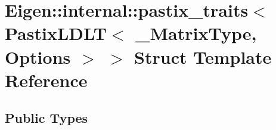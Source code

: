 \hypertarget{struct_eigen_1_1internal_1_1pastix__traits_3_01_pastix_l_d_l_t_3_01___matrix_type_00_01_options_01_4_01_4}{}\section{Eigen\+:\+:internal\+:\+:pastix\+\_\+traits$<$ Pastix\+L\+D\+LT$<$ \+\_\+\+Matrix\+Type, Options $>$ $>$ Struct Template Reference}
\label{struct_eigen_1_1internal_1_1pastix__traits_3_01_pastix_l_d_l_t_3_01___matrix_type_00_01_options_01_4_01_4}
\subsection*{Public Types}
